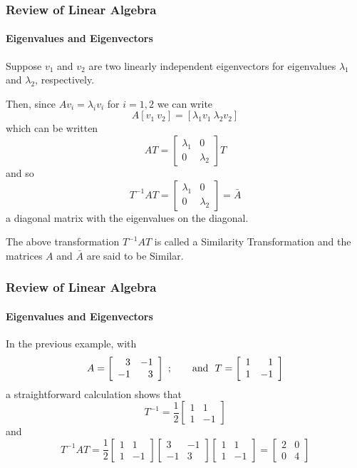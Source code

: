 \begin{frame}
\frametitle{Review of Linear Algebra}
\framesubtitle{Eigenvalues and Eigenvectors}
Suppose $v_1$ and $v_2$ are two linearly independent eigenvectors for eigenvalues
$\lambda_1$ and $\lambda_2$, respectively.

Then, since $Av_i = \lambda_i v_i$ for $i=1,2$ we can write
$$
A[v_1 \ v_2 ] = [\lambda_1v_1 \ \lambda_2v_2 ]
$$
which can be written
$$
AT = \left[ \begin{array}{cc} \lambda_1 & 0 \\ 0 & \lambda_2 \end{array}\right] T
$$
and so
$$
T^{-1}AT = \left[ \begin{array}{cc} \lambda_1 & 0 \\ 0 & \lambda_2 \end{array}\right] = \bar A
$$
a diagonal matrix with the eigenvalues on the diagonal.

The above transformation $T^{-1}AT$ is called a {\bor Similarity Transformation} and the matrices $A$ and $\bar A$ are said to be {\bor Similar}.
\end{frame}
\begin{frame}
\frametitle{Review of Linear Algebra}
\framesubtitle{Eigenvalues and Eigenvectors}
\begin{examp}
In the previous example, with
$$
A = \left[\begin{array}{rr}
3 & -1 \\ -1 & 3
\end{array}\right] \ ; \qquad \mbox{\rm and }\
T = \left[\begin{array}{rr}
1 & 1 \\ 1 & -1
\end{array}\right]
$$
a straightforward calculation shows that
$$
T^{-1} = \frac{1}{2}\left[\begin{array}{rr}
1 & 1 \\ 1 & -1
\end{array}\right]
$$
and
$$
T^{-1}AT = \frac{1}{2}\left[\begin{array}{rr}
1 & 1 \\ 1 & -1
\end{array}\right]
\left[\begin{array}{rr}
3 & -1 \\ -1 & 3
\end{array}\right]
\left[\begin{array}{rr}
1 & 1 \\ 1 & -1
\end{array}\right]
=
\left[\begin{array}{rr}
2 & 0 \\ 0 & 4
\end{array}\right]
$$
\end{examp}
\end{frame}
